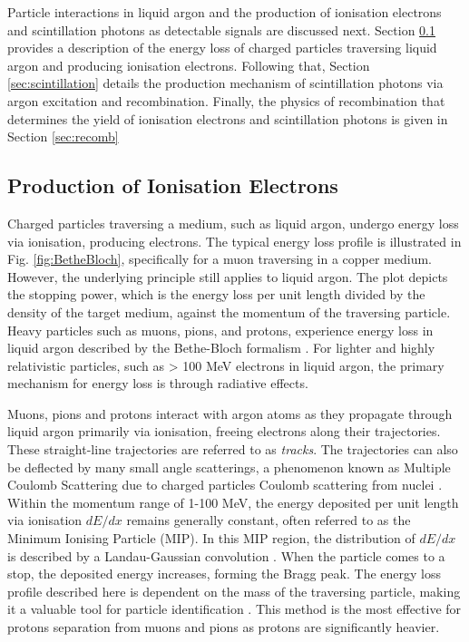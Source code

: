 Particle interactions in liquid argon and the production of ionisation electrons and scintillation photons as detectable signals are discussed next.       
Section \ref{sec3:bethebloch} provides a description of the energy loss of charged particles traversing liquid argon and producing ionisation electrons.                          
Following that, Section \ref{sec:scintillation} details the production mechanism of scintillation photons via argon excitation and recombination.                                       
Finally, the physics of recombination that determines the yield of ionisation electrons and scintillation photons is given in Section \ref{sec:recomb}
\subsection{Production of Ionisation Electrons}
\label{sec3:bethebloch}

Charged particles traversing a medium, such as liquid argon, undergo energy loss via ionisation, producing electrons.                                                                       
The typical energy loss profile is illustrated in Fig. \ref{fig:BetheBloch}, specifically for a muon traversing in a copper medium.
However, the underlying principle still applies to liquid argon.
The plot depicts the stopping power, which is the energy loss per unit length divided by the density of the target medium, against the momentum of the traversing particle.
Heavy particles such as muons, pions, and protons, experience energy loss in liquid argon described by the Bethe-Bloch formalism \cite{Passage}.
For lighter and highly relativistic particles, such as > 100 MeV electrons in liquid argon, the primary mechanism for energy loss is through radiative effects.

Muons, pions and protons interact with argon atoms as they propagate through liquid argon primarily via ionisation, freeing electrons along their trajectories.
These straight-line trajectories are referred to as \textit{tracks}.
The trajectories can also be deflected by many small angle scatterings, a phenomenon known as Multiple Coulomb Scattering due to charged particles Coulomb scattering from nuclei \cite{Passage}. 
Within the momentum range of 1-100 MeV, the energy deposited per unit length via ionisation $dE/dx$ remains generally constant, often referred to as the Minimum Ionising Particle (MIP).
In this MIP region, the distribution of $dE/dx$ is described by a Landau-Gaussian convolution \cite{Passage}. 
When the particle comes to a stop, the deposited energy increases, forming the Bragg peak.
The energy loss profile described here is dependent on the mass of the traversing particle, making it a valuable tool for particle identification \cite{argoneut}.
This method is the most effective for protons separation from muons and pions as protons are significantly heavier.

